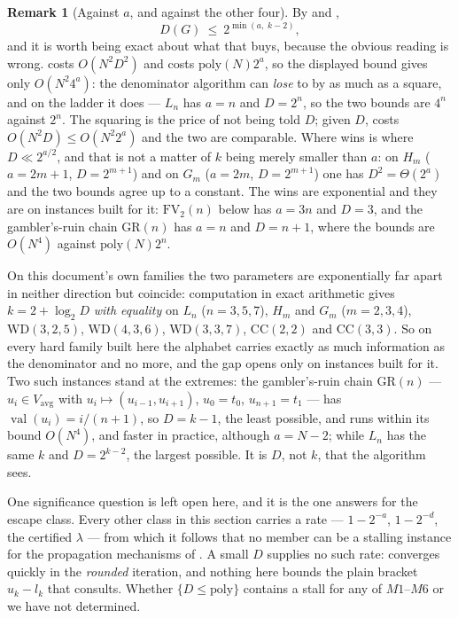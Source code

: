 \documentclass[11pt]{article}
\theoremstyle{plain}
\theoremstyle{definition}
\newtheorem{remark}[theorem]{Remark}
\DeclareMathOperator{\val}{val}
\newcommand{\Vavg}{V_{\mathrm{avg}}}
\begin{document}
\begin{remark}[Against $a$, and against the other four]\label{rem:alphabet-compare}
By  and ,
\[
  D(G)\ \le\ 2^{\min(a,\;k-2)},
\]
and it is worth being exact about what that buys, because the obvious
reading is wrong.  costs $O(N^{2}D^{2})$ and
 costs $\mathrm{poly}(N)2^{a}$, so the displayed bound
gives only $O(N^{2}4^{a})$: the denominator algorithm can \emph{lose} to
 by as much as a square, and on the ladder it does ---
$L_n$ has $a=n$ and $D=2^{n}$, so the two bounds are $4^{n}$ against
$2^{n}$. The squaring is the price of not being told $D$; given $D$,
 costs $O(N^{2}D)\le O(N^{2}2^{a})$ and the two
are comparable. Where  wins is where
$D\ll2^{a/2}$, and that is not a matter of $k$ being merely smaller than
$a$: on $H_m$ ($a=2m+1$, $D=2^{m+1}$) and on $G_m$ ($a=2m$, $D=2^{m+1}$)
one has $D^{2}=\Theta(2^{a})$ and the two bounds agree up to a constant.
The wins are exponential and they are on instances built for it:
$\mathrm{FV}_2(n)$ below has $a=3n$ and $D=3$, and the gambler's-ruin
chain $\mathrm{GR}(n)$ has $a=n$ and $D=n+1$, where the bounds are
$O(N^{4})$ against $\mathrm{poly}(N)2^{n}$.

On this
document's own families the two parameters are exponentially far apart in
neither direction but coincide: computation in exact arithmetic gives
$k=2+\log_2 D$ \emph{with equality} on $L_n$ ($n=3,5,7$), $H_m$ and $G_m$
($m=2,3,4$), $\mathrm{WD}(3,2,5)$, $\mathrm{WD}(4,3,6)$,
$\mathrm{WD}(3,3,7)$, $\mathrm{CC}(2,2)$ and $\mathrm{CC}(3,3)$. So on
every hard family built here the alphabet carries exactly as much
information as the denominator and no more, and the gap opens only on
instances built for it. Two such instances stand at the extremes: the
gambler's-ruin chain $\mathrm{GR}(n)$ --- $u_i\in\Vavg$ with
$u_i\mapsto(u_{i-1},u_{i+1})$, $u_0=t_0$, $u_{n+1}=t_1$ --- has
$\val(u_i)=i/(n+1)$, so $D=k-1$, the least possible, and
 runs within its bound $O(N^{4})$, and faster
in practice, although $a=N-2$; while
$L_n$ has the same $k$ and $D=2^{k-2}$, the largest possible. It is $D$,
not $k$, that the algorithm sees.

One significance question is left open here, and it is the one
 answers for the escape class. Every other class in
this section carries a rate --- $1-2^{-a}$, $1-2^{-d}$, the certified
$\lambda$ --- from which it follows that no member can be a stalling
instance for the propagation mechanisms of . A small $D$
supplies no such rate:  converges quickly in the
\emph{rounded} iteration, and nothing here bounds the plain bracket
$u_k-l_k$ that  consults. Whether
$\{D\le\mathrm{poly}\}$ contains a stall for any of $M1$--$M6$ or
 we have not determined.
\end{remark}
\end{document}
